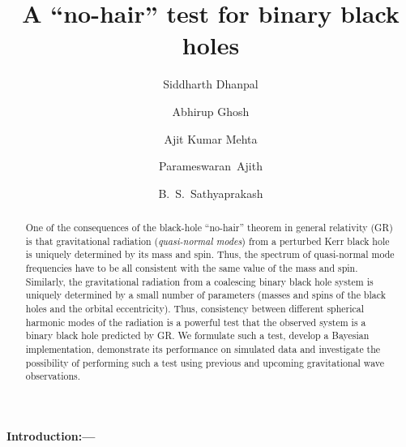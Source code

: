 \documentclass[prl,preprintnumbers,twocolumn,eqsecnum,floatfix,a4paper,nofootinbib,superscriptaddress]{revtex4}
\begin{document}
\title{A ``no-hair'' test for binary black holes}

\author{Siddharth Dhanpal}
\author{Abhirup Ghosh}
\author{Ajit Kumar Mehta}
\author{Parameswaran~Ajith}
\author{B.~S.~Sathyaprakash}

\begin{abstract}
One of the consequences of the black-hole ``no-hair'' theorem in general relativity (GR) is that gravitational radiation (\emph{quasi-normal modes}) from a perturbed Kerr black hole is uniquely determined by its mass and spin. Thus, the spectrum of quasi-normal mode frequencies have to be all consistent with the same value of the mass and spin. Similarly, the gravitational radiation from a coalescing binary black hole system is uniquely determined by a small number of parameters (masses and spins of the black holes and the orbital eccentricity). Thus, consistency between different spherical harmonic modes of the radiation is a powerful test that the observed system is a binary black hole predicted by GR. We formulate such a test, develop a Bayesian implementation, demonstrate its performance on simulated data and investigate the possibility of performing such a test using previous and upcoming gravitational wave observations. 
\end{abstract}
\maketitle
\paragraph{Introduction:---}
\end{document}
